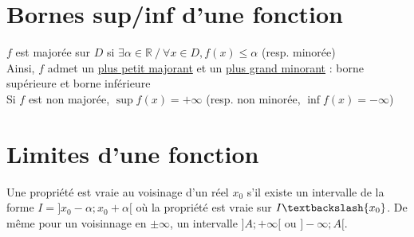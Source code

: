 \section{Bornes sup/inf d'une fonction}\label{sec:bornes-sup/inf-d'une-fonction}

$f$ est majorée sur $D$ si $\exists \alpha \in \mathbb{R}\ /\ \forall x \in D, f(x) \le \alpha$ (resp. minorée)\\

Ainsi, $f$ admet un \underline{plus petit majorant} et un \underline{plus grand minorant} : borne supérieure et borne inférieure\\
Si $f$ est non majorée, $\sup f(x) = +\infty$ (resp. non minorée, $\inf f(x) = -\infty$)


\section{Limites d'une fonction}\label{sec:limites-d'une-fonction}

Une propriété est vraie au voisinage d'un réel $x_0$ s'il existe un intervalle de la forme $I = ]x_0 - \alpha ; x_0 + \alpha[$ où la propriété est vraie sur $I \textbackslash \{x_0\}$.
De même pour un voisinnage en $\pm \infty$, un intervalle $]A ; +\infty[$ ou $]-\infty ; A[$.


